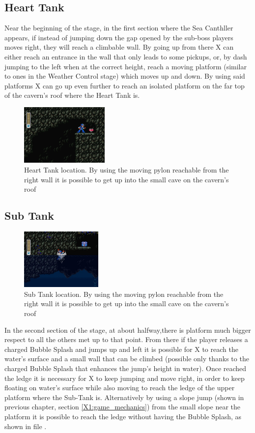 \subsection{Heart Tank}
Near the beginning of the stage, in the first section where the Sea Canthller appears, if instead of jumping down the gap opened by the sub-boss players moves right, they will reach a climbable wall. By going up from there X can either reach an entrance in the wall that only leads to some pickups, or, by dash jumping to the left when at the correct height, reach a moving platform (similar to ones in the Weather Control stage) which moves up and down. By using said platforms X can go up even further to reach an isolated platform on the far top of the cavern's roof where the Heart Tank is.
\begin{figure}[htp]
	\centering
	\includegraphics[height=3cm]{figures/X2/Bubble_crab/Crab_heart.png}
	\caption{Heart Tank location. By using the moving pylon reachable from the right wall it is possible to get up into the small cave on the cavern's roof}
\end{figure}

\subsection{Sub Tank}
\begin{figure}[htp]
	\centering
	\includegraphics[height=3cm]{figures/X2/Bubble_crab/Crab_tank.png}
	\caption{Sub Tank location. By using the moving pylon reachable from the right wall it is possible to get up into the small cave on the cavern's roof}
\end{figure}
In the second section of the stage, at about halfway,there is platform much bigger respect to all the others met up to that point. From there if the player releases a charged Bubble Splash and jumps up and left it is possible for X to reach the water's surface and a small wall that can be climbed (possible only thanks to the charged Bubble Splash that enhances the jump's height in water). Once reached the ledge it is necessary for X to keep jumping and move right, in order to keep floating on water's surface while also moving to reach the ledge of the upper platform where the Sub-Tank is. Alternatively by using a slope jump (shown in previous chapter, section \ref{X1:game_mechanics}) from the small slope near the platform it is possible to reach the ledge without having the Bubble Splash, as shown in file .

